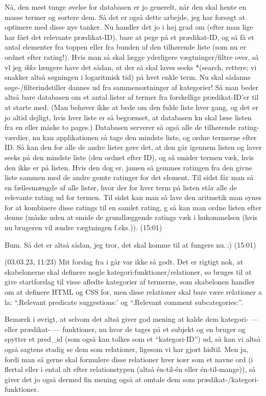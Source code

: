 \documentclass{report}
\begin{document}
Nå, den mest tunge øvelse for databasen er jo generelt, når den skal hente en masse termer og sortere dem. Så det er også dette arbejde, jeg har forsøgt at optimere med disse nye tanker. Nu handler det jo i høj grad om (efter man lige har fået det relevante prædikat-ID), bare at pege på et prædikat-ID, og så få et antal elementer fra toppen eller fra bunden af den tilhørende liste (som nu er ordnet efter rating!). Hvis man så skal lægge yderligere vægtninger/filtre over, så vl jeg \emph{ikke} længere have det sådan, at der så skal laves seeks *(search, rettere; vi snakker altså søgningen i logaritmisk tid) på hvet enkle term. Nu skal sådanne søge-/filterindstiller dannes ud fra sammensætninger af kategorier! Så man beder altså bare databasen om et antal lister af termer fra forskellige prædikat-ID'er til at starte med. (Man behøver ikke at bede om den fulde liste hver gang, og det er jo altid dejligt, hvis hver liste er så begrænset, at databasen kn skal læse listen fra en eller måske to pages.) Databasen serverer så også alle de tilhørende rating-værdier, nu kan applikationen så tage den mindste liste, og ordne termerne efter ID. Så kan den for alle de andre lister gøre det, at den går igennem listen og laver seeks på den mindste liste (den ordnet efter ID), og så smider termen væk, hvis den ikke er på listen. Hvis den dog er, jamen så gemmes ratingen fra den givne liste sammen med de andre gemte ratinger for det element. Til sidst får man så en fællesmængde af alle lister, hvor der for hver term på listen står alle de relevante rating ud for termen. Til sidst kan man så lave den aritmetik man synes for at kombinere disse ratings til en samlet rating, g så kan man ordne listen efter denne (måske uden at smide de grundlæggende ratings væk i hukommelsen (hvis nu brugeren vil ændre vægtningen f.eks.)). (15:01) 

Bum. Så det er altså sådan, jeg tror, det skal komme til at fungere nu.\,:) (15:01)

(03.03.23, 11:23) Mit forslag fra i går var ikke så godt. Det er rigtigt nok, at skabelonerne skal definere nogle kategori-funktioner/relationer, so bruges til at give startforslag til visse afledte kategorier af termerne, som skabelonen handler om at definere HTML og CSS for, men disse relationer skal bare være relationer a la: ``.Relevant predicate suggestions:' og ``.Relevant comment subcategories:''. 

Bemærk i øvrigt, at selvom det altså giver god mening at kalde dem kategori- --- eller prædikat- --- funktioner, nu hvor de tages på et subjekt og en bruger og spytter et pred\_id (som også kan tolkes som et ``kategori-ID'') ud, så kan vi altså også sagtens stadig se dem som relationer, ligesom vi har gjort hidtil. Men ja, fordi man så gerne skal formulere disse relationer hver især som et navne ord (i flertal eller i ental alt efter relationstypen (altså én-til-én eller én-til-mange)), så giver det jo også dermed fin mening også at omtale dem som prædikat-/kategori-funktioner. 
\end{document}
